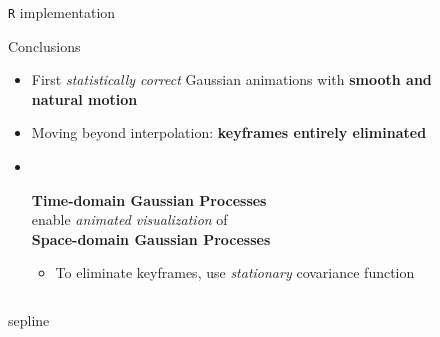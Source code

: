 \documentclass[final,t]{beamer}\usepackage[]{graphicx}\usepackage[]{color}
\begin{document}
\begin{frame}[fragile]
\begin{columns}[T,onlytextwidth]
\begin{column}{.325\linewidth}
{\begin{block}{\texttt{R} implementation}
      \end{block}

      \vfill

      \begin{block}{Conclusions}
        \begin{itemize}
          \item First \textit{statistically correct} Gaussian animations with
            \textbf{smooth and \\ natural motion}
          \item Moving beyond interpolation: \textbf{keyframes entirely
            eliminated}
            
          \item \ \vspace{-1.2em} \\
            { \centering
              \textbf{Time-domain Gaussian Processes}
              \\ enable \textit{animated visualization} of 
              \\ \textbf{Space-domain Gaussian Processes}
              \begin{itemize}
                \item To eliminate keyframes,
                  use \textit{stationary} covariance function
              \end{itemize}
            }
        \end{itemize}
      \end{block}

      }%
    \end{column}

  \end{columns}

  \vspace{0.5em}
  \begin{beamercolorbox}[wd=0.9875\paperwidth]{sepline}
    \centering
    \rule{0pt}{3pt}
  \end{beamercolorbox}


\end{frame}
\end{document}
